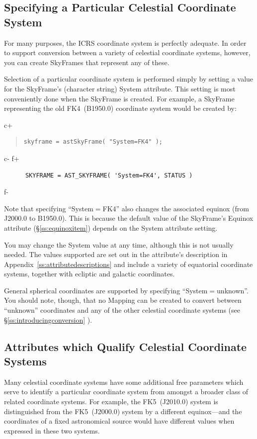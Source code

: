 \documentclass[twoside,11pt]{article}
\newcommand{\appref}[1]{Appendix~\ref{#1}}
\newcommand{\secref}[1]{\S\ref{#1}}
\newcommand{\appref}[1]{\ref{#1}}
\newcommand{\secref}[1]{\ref{#1}}
\begin{document}
\subsection{Specifying a Particular Celestial Coordinate System}

For many purposes, the ICRS coordinate system is perfectly
adequate. In order to support conversion between a variety of
celestial coordinate systems, however, you can create SkyFrames that
represent any of these.

Selection of a particular coordinate system is performed simply by
setting a value for the SkyFrame's (character string) System
attribute. This setting is most conveniently done when the SkyFrame is
created. For example, a SkyFrame representing the old FK4~(B1950.0)
coordinate system would be created by:

c+
\begin{quote}
\small
\begin{verbatim}
skyframe = astSkyFrame( "System=FK4" );
\end{verbatim}
\normalsize
\end{quote}
c-
f+
\small
\begin{verbatim}
      SKYFRAME = AST_SKYFRAME( 'System=FK4', STATUS )
\end{verbatim}
\normalsize
f-

Note that specifying ``System$=$FK4'' also changes the associated
equinox (from J2000.0 to B1950.0). This is because the default value
of the SkyFrame's Equinox attribute (\secref{ss:equinoxitem}) depends
on the System attribute setting.

You may change the System value at any time, although this is not
usually needed.  The values supported are set out in the attribute's
description in \appref{ss:attributedescriptions} and include a variety
of equatorial coordinate systems, together with ecliptic and galactic
coordinates.

General spherical coordinates are supported by specifying
``System$=$unknown''. You should note, though, that no Mapping can be 
created to convert between ``unknown'' coordinates and any of the other 
celestial coordinate systems (see \secref{ss:introducingconversion} ).

\subsection{Attributes which Qualify Celestial Coordinate Systems}

Many celestial coordinate systems have some additional free parameters
which serve to identify a particular coordinate system from amongst a
broader class of related coordinate systems. For example, the
FK5~(J2010.0) system is distinguished from the FK5~(J2000.0)
system by a different equinox---and the coordinates of a fixed
astronomical source would have different values when expressed in
these two systems.
\end{document}
